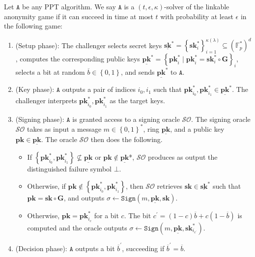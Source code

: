 \documentclass[draft]{llncs} %
\begin{document}
\begin{definition}\label{linkable-anonymity-game} Let $\texttt{A}$ be any PPT algorithm. We say $\texttt{A}$ is a $(t, \epsilon, \kappa)$-solver of the linkable anonymity game if it can succeed in time at most $t$ with probability at least $\epsilon$ in the following game:

\begin{enumerate}
\item (Setup phase): The challenger selects secret keys $\underline{\textbf{sk}}^* = \left\{\textbf{sk}_i^*\right\}_{i=1}^{\kappa(\lambda)} \subseteq (\mathbb{F}_p^*)^d$, computes the corresponding public keys $\underline{\textbf{pk}}^* = \left\{\textbf{pk}_i^* \mid \textbf{pk}_i^* = \textbf{sk}_i^* \circ \textbf{G}\right\}_i$, selects a bit at random $\overline{b} \in \left\{0, 1\right\}$, and sends $\underline{\textbf{pk}}^*$ to $\texttt{A}$.

\item (Key phase): $\texttt{A}$ outputs a pair of indices $i_0, i_1$ such that $\textbf{pk}_{i_0}^*, \textbf{pk}_{i_1}^* \in \underline{\textbf{pk}}^*$. The challenger interprets $\textbf{pk}_{i_0}^*, \textbf{pk}_{i_1}^*$ as the target keys.

\item (Signing phase):  $\texttt{A}$ is granted access to a signing oracle $\mathcal{SO}$. The signing oracle $\mathcal{SO}$ takes as input a message $m \in \left\{0, 1\right\}^*$, ring $\underline{\textbf{pk}}$, and a public key $\textbf{pk} \in \underline{\textbf{pk}}$. The oracle $\mathcal{SO}$ then does the following.
\begin{itemize}
\item If $\left\{\textbf{pk}_{i_0}^*, \textbf{pk}_{i_1}^*\right\} \not\subseteq \underline{\textbf{pk}}$ or $\textbf{pk} \notin \underline{\textbf{pk}}$*, $\mathcal{SO}$ produces as output the distinguished failure symbol $\bot$.

\item Otherwise, if $\textbf{pk} \notin \left\{\textbf{pk}_{i_0}^*, \textbf{pk}_{i_1}^*\right\}$, then $\mathcal{SO}$ retrieves $\textbf{sk} \in \underline{\textbf{sk}}^*$ such that $\textbf{pk} = \textbf{sk}  \circ \textbf{G}$, and outputs $\sigma \leftarrow \texttt{Sign}(m, \underline{\textbf{pk}}, \textbf{sk})$.

\item Otherwise, $\textbf{pk} = \textbf{pk}_{i_c}^*$ for a bit $c$. The bit $c^\prime = (1-c)\overline{b} + c(1-\overline{b})$ is computed and the oracle outputs $\sigma \leftarrow \texttt{Sign}(m, \underline{\textbf{pk}}, \textbf{sk}_{i_{c^\prime}}^*)$.
\end{itemize}

\item (Decision phase): $\texttt{A}$ outputs a bit $\overline{b}^\prime$, succeeding if $\overline{b}^\prime = \overline{b}$.
\end{enumerate}
\end{definition}
\end{document}
